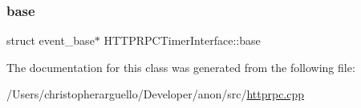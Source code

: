 \subsubsection{\texorpdfstring{base}{base}}
{\footnotesize\ttfamily struct event\+\_\+base$\ast$ H\+T\+T\+P\+R\+P\+C\+Timer\+Interface\+::base\hspace{0.3cm}{\ttfamily [private]}}



The documentation for this class was generated from the following file\+:\begin{DoxyCompactItemize}
\item 
/\+Users/christopherarguello/\+Developer/anon/src/\mbox{\hyperlink{httprpc_8cpp}{httprpc.\+cpp}}\end{DoxyCompactItemize}
